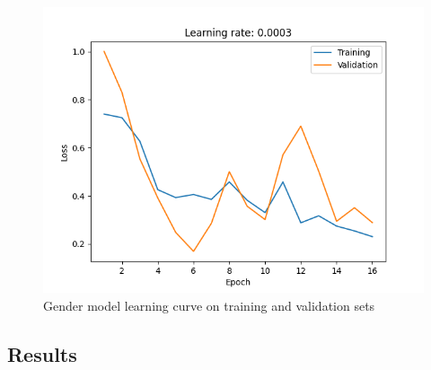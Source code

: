     \begin{figure}[htbp]
        \centering
        \includegraphics[width=\linewidth]{../outputs/gender/gender1/loss-curve.png}
        \caption{Gender model learning curve on training and validation sets}
        \label{fig:gender-learning-curve}
    \end{figure}

\subsection{Results}

